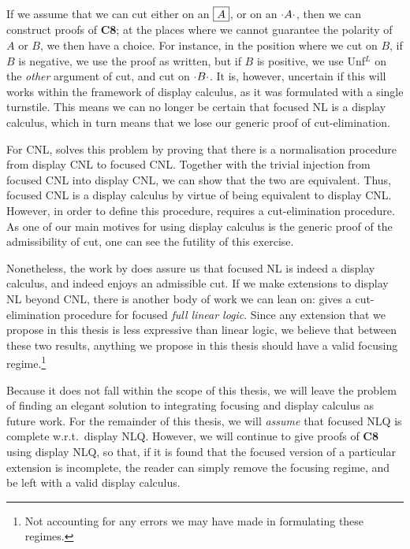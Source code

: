 If we assume that we can cut either on an $\boxed{A}$, or on an
${\cdot}A{\cdot}$, then we can construct proofs of \textbf{C8}; at the
places where we cannot guarantee the polarity of $A$ or $B$, we then
have a choice. For instance, in the position where we cut on $B$, if
$B$ is negative, we use the proof as written, but if $B$ is positive,
we use Unf$^L$ on the \emph{other} argument of cut, and cut on
${\cdot}B{\cdot}$. It is, however, uncertain if this will works within the
framework of display calculus, as it was formulated with a single
turnstile.
This means we can no longer be certain that focused NL is a display
calculus, which in turn means that we lose our generic proof of
cut-elimination.

For CNL, \citet{bastenhof2011} solves this problem by proving that
there is a normalisation procedure from display CNL to focused CNL.
Together with the trivial injection from focused CNL into display CNL,
we can show that the two are equivalent.
Thus, focused CNL is a display calculus by virtue of being equivalent
to display CNL. However, in order to define this procedure,
\citet{bastenhof2011} requires a cut-elimination procedure. As one of
our main motives for using display calculus is the generic proof of
the admissibility of cut, one can see the futility of this exercise.

Nonetheless, the work by \citeauthor{bastenhof2011} does assure us
that focused NL is indeed a display calculus, and indeed enjoys
an admissible cut.
If we make extensions to display NL beyond CNL, there is another body
of work we can lean on: \citet{andreoli1992} gives a cut-elimination
procedure for focused \emph{full linear logic}. Since any extension
that we propose in this thesis is less expressive than linear logic,
we believe that between these two results, anything we propose in this
thesis should have a valid focusing regime.\footnote{%
  Not accounting for any errors we may have made in formulating these
  regimes.
}

Because it does not fall within the scope of this thesis, we will
leave the problem of finding an elegant solution to integrating
focusing and display calculus as future work.
For the remainder of this thesis, we will \emph{assume} that focused
NLQ is complete w.r.t.\ display NLQ.
However, we will continue to give proofs of 
\textbf{C8} using display NLQ, so that, if it is found that the
focused version of a particular extension is incomplete, the reader
can simply remove the focusing regime, and be left with a valid
display calculus.

